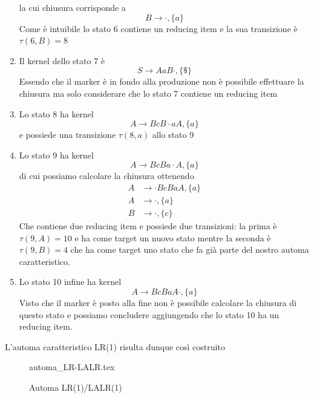 \documentclass[class=book, crop=false, oneside, 12pt]{standalone}
\begin{document}
\begin{enumerate}
    la cui chiusura corrisponde a 
    \begin{equation*}
         B \to \cdot, \{a\} 
    \end{equation*}
    Come è intuibile lo stato 6 contiene un reducing item e la sua transizione è \(\tau(6, B)=8\)
    \item Il kernel dello stato 7 è 
    \begin{equation*}
         S \to  AaB \cdot, \{\$\}  
    \end{equation*}
    Essendo che il marker è in fondo alla produzione non è possibile effettuare la chiusura ma solo considerare che lo stato 7 contiene un reducing item
    \item Lo stato 8 ha kernel
    \begin{equation*}
        A \to BcB \cdot aA, \{a\} 
    \end{equation*}
    e possiede una transizione \(\tau(8, a)\) allo stato 9
    \item Lo stato 9 ha kernel
    \begin{equation*}
        A \to BcBa \cdot A, \{a\} 
    \end{equation*}
    di cui possiamo calcolare la chiusura ottenendo
    \begin{align*}
        A &\to \cdot BcBaA, \{a\} \\
        A &\to \cdot, \{a\} \\
        B &\to \cdot, \{c\}
    \end{align*}
    Che contiene due reducing item e possiede due transizioni: la prima è \(\tau(9, A)=10\) e ha come target un nuovo stato mentre la seconda è \(\tau(9, B)=4\) che ha come target uno stato che fa già parte del nostro automa caratteristico.
    \item Lo stato 10 infine ha kernel
    \begin{equation*}
        A \to BcBaA \cdot, \{a\} 
    \end{equation*}
    Visto che il marker è posto alla fine non è possibile calcolare la chiusura di questo stato e possiamo concludere aggiungendo che lo stato 10 ha un reducing item. 
\end{enumerate}

L'automa caratteristico LR(1) risulta dunque così costruito

\begin{figure}[H]
	\centering
	{automa_LR-LALR.tex}
    \caption{Automa LR(1)/LALR(1)}
    \label{fig:lalr-automata}
\end{figure}
\end{document}
